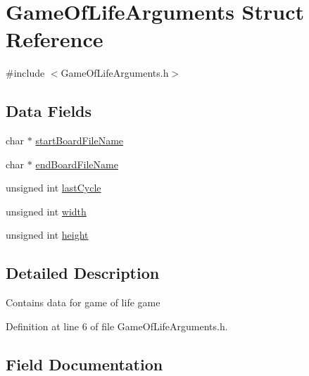 \hypertarget{struct_game_of_life_arguments}{}\section{Game\+Of\+Life\+Arguments Struct Reference}
\label{struct_game_of_life_arguments}


{\ttfamily \#include $<$Game\+Of\+Life\+Arguments.\+h$>$}

\subsection*{Data Fields}
\begin{DoxyCompactItemize}
\item 
char $\ast$ \mbox{\hyperlink{struct_game_of_life_arguments_a65b4618fdae63faa62d903c06fc7d6ae}{start\+Board\+File\+Name}}
\item 
char $\ast$ \mbox{\hyperlink{struct_game_of_life_arguments_a7516ce83e4e7622fa0397786978b45c8}{end\+Board\+File\+Name}}
\item 
unsigned int \mbox{\hyperlink{struct_game_of_life_arguments_adb88c0c2090ffaf055bc57926eea5e79}{last\+Cycle}}
\item 
unsigned int \mbox{\hyperlink{struct_game_of_life_arguments_aca34d28e3d8bcbcadb8edb4e3af24f8c}{width}}
\item 
unsigned int \mbox{\hyperlink{struct_game_of_life_arguments_ab2e78c61905b4419fcc7b4cfc500fe85}{height}}
\end{DoxyCompactItemize}


\subsection{Detailed Description}
Contains data for game of life game 

Definition at line 6 of file Game\+Of\+Life\+Arguments.\+h.



\subsection{Field Documentation}
\mbox{\label{struct_game_of_life_arguments_a7516ce83e4e7622fa0397786978b45c8}} 
